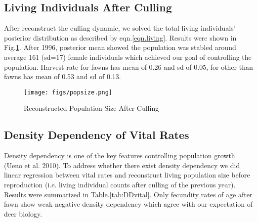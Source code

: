 \documentclass[]{article}
\begin{document}
\subsection{Living Individuals After Culling}
After reconstruct the culling dynamic, we solved the total living individuals' posterior distribution as described by eqn.\ref{eqn.living}. Results were shown in Fig.\ref{Fig.popsize}. After 1996, posterior mean showed the population was stabled around average 161 (sd=17) female individuals which achieved our goal of controlling the population. Harvest rate for fawns has mean of 0.26 and sd of 0.05, for other than fawns has mean of 0.53 and sd of 0.13. 
\begin{figure}[htbp] %
	\centering
	\texttt{[image: figs/popsize.png]}
	\caption{Reconstructed Population Size After Culling}
	\label{Fig.popsize}
\end{figure}

\subsection{Density Dependency of Vital Rates}
Density dependency is one of the key features controlling population growth (Ueno et al. 2010). To address whether there exist density dependency we did linear regression between vital rates and reconstruct living population size before reproduction (i.e. living individual counts after culling of the previous year). Results were summarized in Table.\ref{tab:DDvital}. Only fecundity rates of age after fawn show weak negative density dependency which agree with our expectation of deer biology. 
\end{document}
